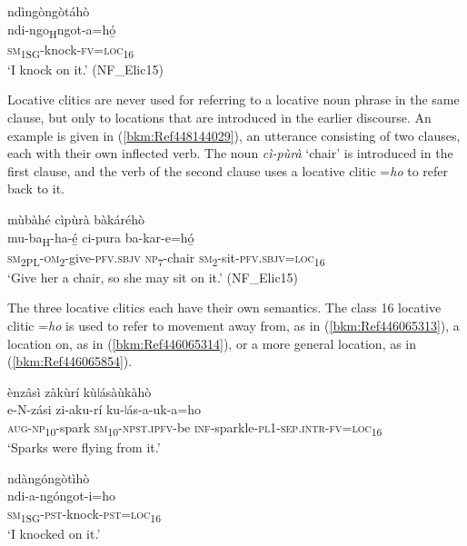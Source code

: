 \ea
\label{exampleiknockonit}
\glll ndìngòngòtáhò\\
ndi-ngo\textsubscript{H}ngot-a=hó̲\\
\textsc{sm}\textsubscript{1SG}-knock-\textsc{fv}=\textsc{loc}\textsubscript{16}\\
\glt ‘I knock on it.’ (NF\_Elic15)
\z

Locative clitics are never used for referring to a locative noun phrase in the same clause, but only to locations that are introduced in the earlier discourse. An example is given in (\ref{bkm:Ref448144029}), an utterance consisting of two clauses, each with their own inflected verb. The noun \textit{cì-pùrà} ‘chair’ is introduced in the first clause, and the verb of the second clause uses a locative clitic =\textit{ho} to refer back to it.

\ea
\label{bkm:Ref448144029}
mùbàhé cìpùrà bàkáréhò\\
\gll mu-ba\textsubscript{H}-ha-é̲    ci-pura  ba-kar-e=hó̲\\
\textsc{sm}\textsubscript{2PL}-\textsc{om}\textsubscript{2}-give-\textsc{pfv}.\textsc{sbjv}  \textsc{np}\textsubscript{7}-chair  \textsc{sm}\textsubscript{2}-sit-\textsc{pfv}.\textsc{sbjv}=\textsc{loc}\textsubscript{16}\\
\glt ‘Give her a chair, so she may sit on it.’ (NF\_Elic15)
\z

The three locative clitics each have their own semantics. The class 16 locative clitic =\textit{ho} is used to refer to movement away from, as in (\ref{bkm:Ref446065313}), a location on, as in (\ref{bkm:Ref446065314}), or a more general location, as in (\ref{bkm:Ref446065854}).

\ea
\label{bkm:Ref446065313}
ènzâsì zàkùrí kùǀásàùkàhò\\
\gll e-N-zási    zi-aku-rí    ku-ǀás-a-uk-a=ho\\
\textsc{aug}-\textsc{np}\textsubscript{10}-spark  \textsc{sm}\textsubscript{10}-\textsc{npst}.\textsc{ipfv}-be  \textsc{inf}-sparkle-\textsc{pl}1-\textsc{sep}.\textsc{intr}-\textsc{fv}=\textsc{loc}\textsubscript{16}\\
\glt ‘Sparks were flying from it.’
\z

\ea
\label{bkm:Ref446065314}
\glll ndàngóngòtìhò\\
ndi-a-ngóngot-i=ho\\
\textsc{sm}\textsubscript{1SG}-\textsc{pst}-knock-\textsc{pst}=\textsc{loc}\textsubscript{16}\\
\glt ‘I knocked on it.’
\z


